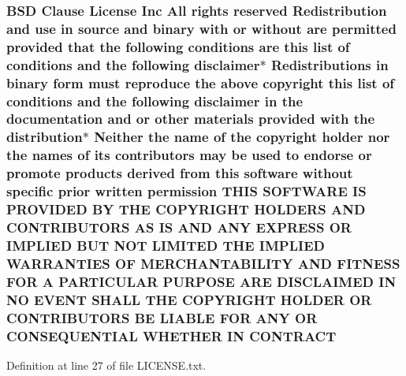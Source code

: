 \subsubsection[{\texorpdfstring{C\+O\+N\+T\+R\+A\+CT}{CONTRACT}}]{\setlength{\rightskip}{0pt plus 5cm}B\+SD Clause License Inc All rights reserved Redistribution and use in source and binary with or without are permitted provided that the following conditions are this list of conditions and the following disclaimer$\ast$ Redistributions in binary form must reproduce the above copyright this list of conditions and the following disclaimer in the documentation and or other materials provided with the distribution$\ast$ Neither the name of the copyright holder nor the names of its contributors may be used to endorse or promote products derived from this software without specific prior written permission T\+H\+IS S\+O\+F\+T\+W\+A\+RE IS P\+R\+O\+V\+I\+D\+ED BY T\+HE C\+O\+P\+Y\+R\+I\+G\+HT H\+O\+L\+D\+E\+RS A\+ND C\+O\+N\+T\+R\+I\+B\+U\+T\+O\+RS AS IS A\+ND A\+NY E\+X\+P\+R\+E\+SS OR I\+M\+P\+L\+I\+ED B\+UT N\+OT L\+I\+M\+I\+T\+ED T\+HE I\+M\+P\+L\+I\+ED {\bf W\+A\+R\+R\+A\+N\+T\+I\+ES} OF M\+E\+R\+C\+H\+A\+N\+T\+A\+B\+I\+L\+I\+TY A\+ND F\+I\+T\+N\+E\+SS F\+OR A P\+A\+R\+T\+I\+C\+U\+L\+AR P\+U\+R\+P\+O\+SE A\+RE D\+I\+S\+C\+L\+A\+I\+M\+ED IN NO E\+V\+E\+NT S\+H\+A\+LL T\+HE C\+O\+P\+Y\+R\+I\+G\+HT H\+O\+L\+D\+ER OR C\+O\+N\+T\+R\+I\+B\+U\+T\+O\+RS BE L\+I\+A\+B\+LE F\+OR A\+NY OR C\+O\+N\+S\+E\+Q\+U\+E\+N\+T\+I\+AL W\+H\+E\+T\+H\+ER IN C\+O\+N\+T\+R\+A\+CT}\hypertarget{LICENSE_8txt_aaa5eea22ce8028d9371e003fd23516c9}{}\label{LICENSE_8txt_aaa5eea22ce8028d9371e003fd23516c9}


Definition at line 27 of file L\+I\+C\+E\+N\+S\+E.\+txt.

